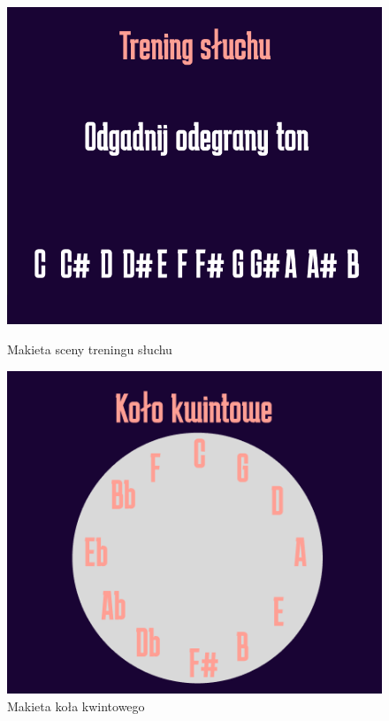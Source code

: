 \clearpage

\begin{figure}[htb]
    \centering
    \begin{minipage}[b]{0.4\textwidth}
        \centering
        \includegraphics[width=0.9\linewidth]{rys03/MakTrening}
        \caption{Makieta sceny treningu słuchu}
        \label{fig:pageLayout5}
    \end{minipage}
    \hspace{0.05\textwidth}
    \begin{minipage}[b]{0.4\textwidth}
        \centering
        \includegraphics[width=0.9\linewidth]{rys03/MakKK}
        \caption{Makieta koła kwintowego}
        \label{fig:pageLayout6}
    \end{minipage}
\end{figure}


